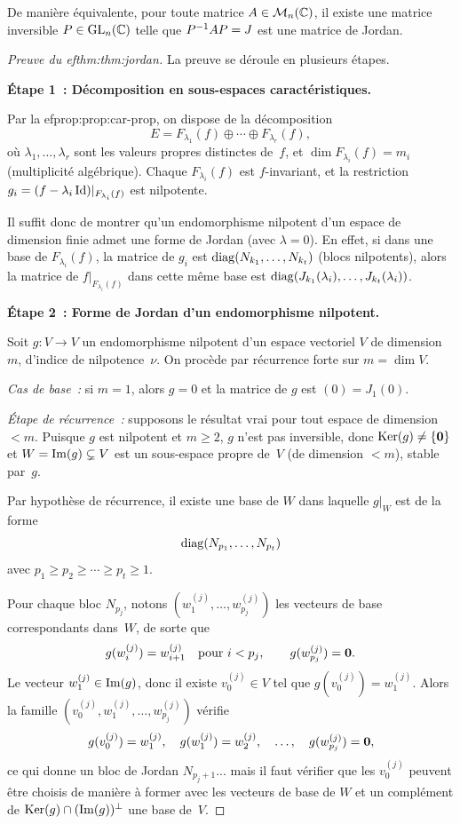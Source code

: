 De manière équivalente, pour toute matrice $A\in\mathcal{M}_n({\mathbb{C}})$, il existe
une matrice inversible $P\in\operatorname{GL}_n({\mathbb{C}})$ telle que
${P}^{-1}AP=J$ est une matrice de Jordan.

\begin{proof}[Preuve du 
ef{thm:thm:jordan}]
  La preuve se déroule en plusieurs étapes.

  \medskip\noindent
  \textbf{Étape 1~: Décomposition en sous-espaces caractéristiques.}

  Par la 
ef{prop:prop:car-prop}, on dispose de la décomposition
  \[
    E=F_{\lambda_1}(f)\oplus\cdots\oplus F_{\lambda_r}(f),
  \]
  où $\lambda_1,\ldots,\lambda_r$ sont les valeurs propres distinctes
  de~$f$, et $\dim F_{\lambda_i}(f)=m_i$ (multiplicité algébrique).
  Chaque $F_{\lambda_i}(f)$ est $f$-invariant, et la restriction
  $g_i=(f-\lambda_i\operatorname{Id})|_{F_{\lambda_i}(f)}$ est nilpotente.

  Il suffit donc de montrer qu'un endomorphisme nilpotent d'un espace de
  dimension finie admet une forme de Jordan (avec $\lambda=0$). En effet,
  si dans une base de $F_{\lambda_i}(f)$, la matrice de $g_i$ est
  $\operatorname{diag}(N_{k_1},\ldots,N_{k_t})$ (blocs nilpotents), alors la matrice
  de $f|_{F_{\lambda_i}(f)}$ dans cette même base est
  $\operatorname{diag}(J_{k_1}(\lambda_i),\ldots,J_{k_t}(\lambda_i))$.

  \medskip\noindent
  \textbf{Étape 2~: Forme de Jordan d'un endomorphisme nilpotent.}

  Soit $g\colon V\to V$ un endomorphisme nilpotent d'un espace vectoriel
  $V$ de dimension $m$, d'indice de nilpotence~$\nu$. On procède par
  récurrence forte sur $m=\dim V$.

  \emph{Cas de base~:} si $m=1$, alors $g=0$ et la matrice de $g$ est
  $(0)=J_1(0)$.

  \emph{Étape de récurrence~:} supposons le résultat vrai pour tout
  espace de dimension $<m$. Puisque $g$ est nilpotent et $m\geq 2$,
  $g$ n'est pas inversible, donc $\operatorname{Ker}(g)\neq\left\{\mathbf{0}\right\}$ et
  $W=\operatorname{Im}(g)\subsetneq V$ est un sous-espace propre de~$V$ (de dimension
  $<m$), stable par~$g$.

  Par hypothèse de récurrence, il existe une base de $W$ dans laquelle
  $g|_W$ est de la forme
  \[
    \operatorname{diag}(N_{p_1},\ldots,N_{p_t})
  \]
  avec $p_1\geq p_2\geq\cdots\geq p_t\geq 1$.

  Pour chaque bloc $N_{p_j}$, notons $(w_1^{(j)},\ldots,w_{p_j}^{(j)})$
  les vecteurs de base correspondants dans~$W$, de sorte que
  \[
    g(w_i^{(j)})=w_{i+1}^{(j)} \quad\text{pour } i<p_j,\qquad
    g(w_{p_j}^{(j)})=\mathbf{0}.
  \]
  Le vecteur $w_1^{(j)}\in\operatorname{Im}(g)$, donc il existe $v_0^{(j)}\in V$ tel
  que $g(v_0^{(j)})=w_1^{(j)}$. Alors la famille
  $(v_0^{(j)},w_1^{(j)},\ldots,w_{p_j}^{(j)})$ vérifie
  \[
    g(v_0^{(j)})=w_1^{(j)},\quad g(w_1^{(j)})=w_2^{(j)},\quad\ldots,\quad
    g(w_{p_j}^{(j)})=\mathbf{0},
  \]
  ce qui donne un bloc de Jordan $N_{p_j+1}$... mais il faut vérifier
  que les $v_0^{(j)}$ peuvent être choisis de manière à former avec les
  vecteurs de base de $W$ et un complément de $\operatorname{Ker}(g)\cap(\operatorname{Im}(g))^\perp$
  une base de~$V$.


\end{proof}
